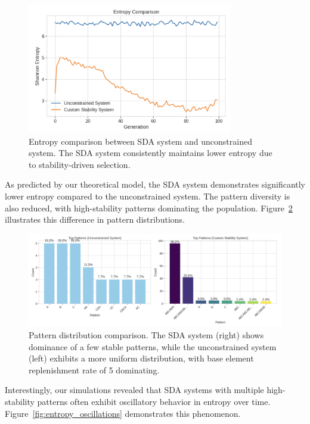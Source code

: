 \documentclass[preprint,12pt]{elsarticle}
\begin{document}
\begin{figure}[h]
    \centering
    \includegraphics[width=0.8\textwidth]{entropy_comparison}
    \caption{Entropy comparison between SDA system and unconstrained system. The SDA system consistently maintains lower entropy due to stability-driven selection.}
    \label{fig:entropy_comparison}
\end{figure}

As predicted by our theoretical model, the SDA system demonstrates significantly lower entropy compared to the unconstrained system. The pattern diversity is also reduced, with high-stability patterns dominating the population. Figure~\ref{fig:pattern_distribution} illustrates this difference in pattern distributions.

\begin{figure}[h]
    \centering
    \includegraphics[width=1\textwidth]{pattern_distribution}
    \caption{Pattern distribution comparison. The SDA system (right) shows dominance of a few stable patterns, while the unconstrained system (left) exhibits a more uniform distribution, with base element replenishment rate of 5 dominating.}
    \label{fig:pattern_distribution}
\end{figure}

Interestingly, our simulations revealed that SDA systems with multiple high-stability patterns often exhibit oscillatory behavior in entropy over time. Figure~\ref{fig:entropy_oscillations} demonstrates this phenomenon.
\end{document}
